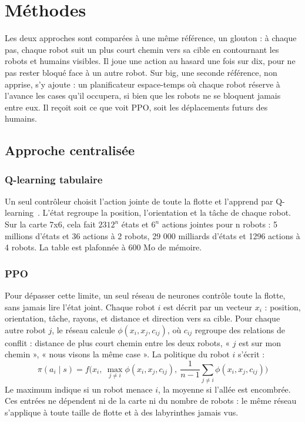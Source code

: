 \documentclass[11pt,a4paper]{article}
\begin{document}
\section{Méthodes}

Les deux approches sont comparées à une même référence, un glouton : à chaque pas, chaque robot suit un plus court chemin vers sa cible en contournant les robots et humains visibles. Il joue une action au hasard une fois sur dix, pour ne pas rester bloqué face à un autre robot. Sur big, une seconde référence, non apprise, s'y ajoute : un planificateur espace-temps où chaque robot réserve à l'avance les cases qu'il occupera, si bien que les robots ne se bloquent jamais entre eux. Il reçoit soit ce que voit PPO, soit les déplacements futurs des humains.

\subsection{Approche centralisée}

\subsubsection{Q-learning tabulaire} 
Un seul contrôleur choisit l'action jointe de toute la flotte et l'apprend par Q-learning~\cite{watkins1992}. L'état regroupe la position, l'orientation et la tâche de chaque robot. Sur la carte 7x6, cela fait $2312^n$ états et $6^n$ actions jointes pour n robots : 5 millions d'états et 36 actions à 2 robots, 29 000 milliards d'états et 1296 actions à 4 robots. La table est plafonnée à 600 Mo de mémoire.

\subsubsection{PPO}
Pour dépasser cette limite, un seul réseau de neurones contrôle toute la flotte, sans jamais lire l'état joint. Chaque robot $i$ est décrit par un vecteur $x_i$ : position, orientation, tâche, rayons, et distance et direction vers sa cible. Pour chaque autre robot $j$, le réseau calcule $\phi(x_i, x_j, c_{ij})$, où $c_{ij}$ regroupe des relations de conflit : distance de plus court chemin entre les deux robots, « $j$ est sur mon chemin », « nous visons la même case ». La politique du robot $i$ s'écrit :
\[
\pi(a_i \mid s) = f\Big(x_i,\ \max_{j \neq i} \phi(x_i, x_j, c_{ij}),\ \frac{1}{n-1}\sum_{j \neq i} \phi(x_i, x_j, c_{ij})\Big)
\]
Le maximum indique si un robot menace $i$, la moyenne si l'allée est encombrée. Ces entrées ne dépendent ni de la carte ni du nombre de robots : le même réseau s'applique à toute taille de flotte et à des labyrinthes jamais vus.
\end{document}
